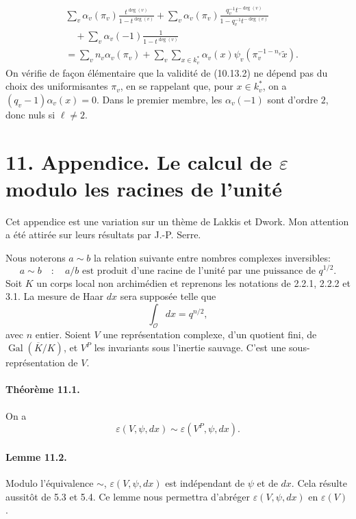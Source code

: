 \documentclass[10pt,letterpaper]{article}
\newcommand{\Gal}{\operatorname{Gal}}
\providecommand{\OO}{\mathcal O}
\providecommand{\OO}{\mathcal O}
\providecommand{\OO}{\mathcal O}
\providecommand{\OO}{\mathcal O}
\providecommand{\Gal}{\operatorname{Gal}}
\providecommand{\OO}{\mathcal O}
\providecommand{\Gal}{\operatorname{Gal}}
\providecommand{\OO}{\mathcal O}
\providecommand{\Gal}{\operatorname{Gal}}
\providecommand{\OO}{\mathcal O}
\providecommand{\Gal}{\operatorname{Gal}}
\begin{document}
\[
\tag{10.13.2}
\begin{aligned}
&\sum_v\alpha_v(\pi_v)\frac{t^{\deg(v)}}{1-t^{\deg(v)}}
+\sum_v\alpha_v(\pi_v)\frac{q_v^{-1}t^{-\deg(v)}}{1-q_v^{-1}t^{-\deg(v)}}
\\
&\quad+\sum_v\alpha_v(-1)\frac{1}{1-t^{\deg(v)}}
\\
&=\sum_v n_v\alpha_v(\pi_v)
+\sum_v\sum_{x\in k_v^*}\alpha_v(x)\psi_v(\pi_v^{-1-n_v}\widetilde x).
\end{aligned}
\]
On vérifie de façon élémentaire que la validité de (10.13.2) ne dépend pas du choix des uniformisantes \(\pi_v\), en se rappelant que, pour \(x\in k_v^*\), on a \((q_v-1)\alpha_v(x)=0\). Dans le premier membre, les \(\alpha_v(-1)\) sont d'ordre \(2\), donc nuls si \(\ell\ne2\).


\section*{11. Appendice. Le calcul de \(\varepsilon\) modulo les racines de l'unité}

Cet appendice est une variation sur un thème de Lakkis et Dwork. Mon attention a été attirée sur leurs résultats par J.-P. Serre.

Nous noterons \(a\sim b\) la relation suivante entre nombres complexes inversibles:
\[
a\sim b\quad:\quad a/b\text{ est produit d'une racine de l'unité par une puissance de }q^{1/2}.
\]
Soit \(K\) un corps local non archimédien et reprenons les notations de 2.2.1, 2.2.2 et 3.1. La mesure de Haar \(dx\) sera supposée telle que
\[
\int_{\OO}dx=q^{n/2},
\]
avec \(n\) entier. Soient \(V\) une représentation complexe, d'un quotient fini, de \(\Gal(\overline K/K)\), et \(V^P\) les invariants sous l'inertie sauvage. C'est une sous-représentation de \(V\).

\paragraph{Théorème 11.1.} On a
\[
\varepsilon(V,\psi,dx)\sim\varepsilon(V^P,\psi,dx).
\]

\paragraph{Lemme 11.2.} Modulo l'équivalence \(\sim\), \(\varepsilon(V,\psi,dx)\) est indépendant de \(\psi\) et de \(dx\). Cela résulte aussitôt de 5.3 et 5.4. Ce lemme nous permettra d'abréger \(\varepsilon(V,\psi,dx)\) en \(\varepsilon(V)\).
\end{document}
